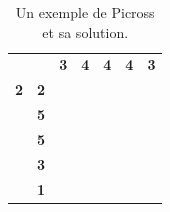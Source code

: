 \documentclass{article}
\begin{document}
\begin{table}[h]
\centering
\begin{tabular}{ccccccc}
\textbf{}  & \textbf{}                       & \textbf{3}                                                                    & \textbf{4}                                                                    & \textbf{4}                                                                    & \textbf{4}                                                                    & \textbf{3}                                                                    \\ \cline{3-7} 
\textbf{2} & \multicolumn{1}{c|}{\textbf{2}} & \multicolumn{1}{c|}{\cellcolor[HTML]{000000}{\color[HTML]{000000} \textbf{}}} & \multicolumn{1}{c|}{\cellcolor[HTML]{000000}\textbf{}}                        & \multicolumn{1}{c|}{\textbf{}}                                                & \multicolumn{1}{c|}{\cellcolor[HTML]{000000}\textbf{}}                        & \multicolumn{1}{c|}{\cellcolor[HTML]{000000}\textbf{}}                        \\ \cline{3-7} 
\textbf{}  & \multicolumn{1}{c|}{\textbf{5}} & \multicolumn{1}{c|}{\cellcolor[HTML]{000000}\textbf{}}                        & \multicolumn{1}{c|}{\cellcolor[HTML]{000000}\textbf{}}                        & \multicolumn{1}{c|}{\cellcolor[HTML]{000000}\textbf{}}                        & \multicolumn{1}{c|}{\cellcolor[HTML]{000000}\textbf{}}                        & \multicolumn{1}{c|}{\cellcolor[HTML]{000000}\textbf{}}                        \\ \cline{3-7} 
\textbf{}  & \multicolumn{1}{c|}{\textbf{5}} & \multicolumn{1}{c|}{\cellcolor[HTML]{000000}{\color[HTML]{000000} \textbf{}}} & \multicolumn{1}{c|}{\cellcolor[HTML]{000000}{\color[HTML]{000000} \textbf{}}} & \multicolumn{1}{c|}{\cellcolor[HTML]{000000}{\color[HTML]{000000} \textbf{}}} & \multicolumn{1}{c|}{\cellcolor[HTML]{000000}{\color[HTML]{000000} \textbf{}}} & \multicolumn{1}{c|}{\cellcolor[HTML]{000000}{\color[HTML]{000000} \textbf{}}} \\ \cline{3-7} 
\textbf{}  & \multicolumn{1}{c|}{\textbf{3}} & \multicolumn{1}{c|}{\textbf{}}                                                & \multicolumn{1}{c|}{\cellcolor[HTML]{000000}\textbf{}}                        & \multicolumn{1}{c|}{\cellcolor[HTML]{000000}\textbf{}}                        & \multicolumn{1}{c|}{\cellcolor[HTML]{000000}\textbf{}}                        & \multicolumn{1}{c|}{\textbf{}}                                                \\ \cline{3-7} 
\textbf{}  & \multicolumn{1}{c|}{\textbf{1}} & \multicolumn{1}{c|}{\textbf{}}                                                & \multicolumn{1}{c|}{\textbf{}}                                                & \multicolumn{1}{c|}{\cellcolor[HTML]{000000}\textbf{}}                        & \multicolumn{1}{c|}{\textbf{}}                                                & \multicolumn{1}{c|}{\textbf{}}   
                                             \\ \cline{3-7} 
\end{tabular}
\caption{Un exemple de Picross et sa solution.}
\end{table}
\end{document}
